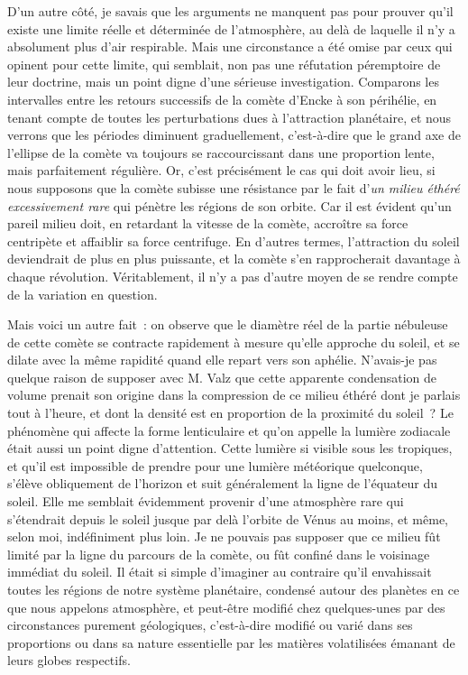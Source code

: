 \documentclass[french,twoside]{book} %
\begin{document}
D’un autre côté, je savais que les arguments ne manquent pas pour prouver qu’il existe une limite réelle et déterminée de l’atmosphère, au delà de laquelle il n’y a absolument plus d’air respirable. Mais une circonstance a été omise par ceux qui opinent pour cette limite, qui semblait, non pas une réfutation péremptoire de leur doctrine, mais un point digne d’une sérieuse investigation. Comparons les intervalles entre les retours successifs de la comète d’Encke à son périhélie, en tenant compte de toutes les perturbations dues à l’attraction planétaire, et nous verrons que les périodes diminuent graduellement, c’est-à-dire que le grand axe de l’ellipse de la comète va toujours se raccourcissant dans une proportion lente, mais parfaitement régulière. Or, c’est précisément le cas qui doit avoir lieu, si nous supposons que la comète subisse une résistance par le fait d’\emph{un milieu éthéré excessivement rare} qui pénètre les régions de son orbite. Car il est évident qu’un pareil milieu doit, en retardant la vitesse de la comète, accroître sa force centripète et affaiblir sa force centrifuge. En d’autres termes, l’attraction du soleil deviendrait de plus en plus puissante, et la comète s’en rapprocherait davantage à chaque révolution. Véritablement, il n’y a pas d’autre moyen de se rendre compte de la variation en question.\par
Mais voici un autre fait : on observe que le diamètre réel de la partie nébuleuse de cette comète se contracte rapidement à mesure qu’elle approche du soleil, et se dilate avec la même rapidité quand elle repart vers son aphélie. N’avais-je pas quelque raison de supposer avec M. Valz que cette apparente condensation de volume prenait son origine dans la compression de ce milieu éthéré dont je parlais tout à l’heure, et dont la densité est en proportion de la proximité du soleil ? Le phénomène qui affecte la forme lenticulaire et qu’on appelle la lumière zodiacale était aussi un point digne d’attention. Cette lumière si visible sous les tropiques, et qu’il est impossible de prendre pour une lumière météorique quelconque, s’élève obliquement de l’horizon et suit généralement la ligne de l’équateur du soleil. Elle me semblait évidemment provenir d’une atmosphère rare qui s’étendrait depuis le soleil jusque par delà l’orbite de Vénus au moins, et même, selon moi, indéfiniment plus loin. Je ne pouvais pas supposer que ce milieu fût limité par la ligne du parcours de la comète, ou fût confiné dans le voisinage immédiat du soleil. Il était si simple d’imaginer au contraire qu’il envahissait toutes les régions de notre système planétaire, condensé autour des planètes en ce que nous appelons atmosphère, et peut-être modifié chez quelques-unes par des circonstances purement géologiques, c’est-à-dire modifié ou varié dans ses proportions ou dans sa nature essentielle par les matières volatilisées émanant de leurs globes respectifs.\par
\end{document}

